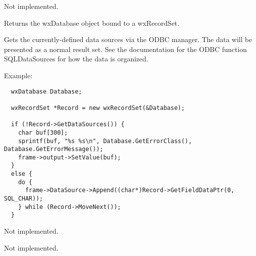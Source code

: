 \begin{twocollist}\itemsep=0pt
\end{twocollist}



Not implemented.



Returns the wxDatabase object bound to a wxRecordSet.

\label{wxrecordsetgetdatasources}


Gets the currently-defined data sources via the ODBC manager. The data will be presented
as a normal result set. See the documentation for the ODBC function SQLDataSources for how the data
is organized.

Example:
  
\begin{verbatim}
  wxDatabase Database;

  wxRecordSet *Record = new wxRecordSet(&Database);

  if (!Record->GetDataSources()) {
    char buf[300];
    sprintf(buf, "%s %s\n", Database.GetErrorClass(), Database.GetErrorMessage());
    frame->output->SetValue(buf);
  }
  else {
    do {
      frame->DataSource->Append((char*)Record->GetFieldDataPtr(0, SQL_CHAR));
    } while (Record->MoveNext());
  }
\end{verbatim}



Not implemented.



Not implemented.

